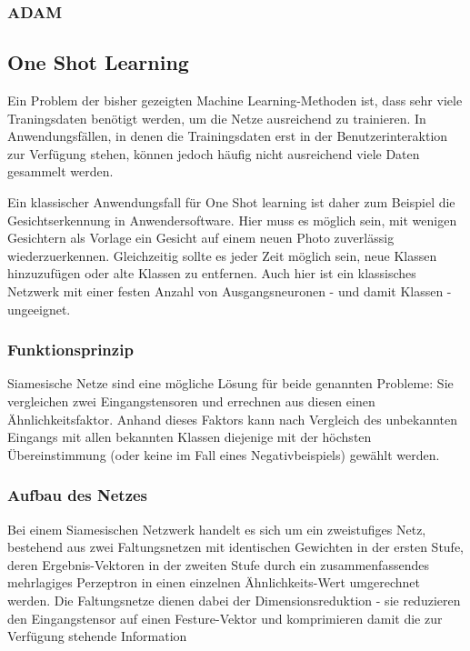 		\subsubsection{ADAM}
		
	\subsection{ One Shot Learning }
	Ein Problem der bisher gezeigten Machine Learning-Methoden ist, dass sehr viele Traningsdaten benötigt werden, um die Netze ausreichend zu trainieren. In Anwendungsfällen, in denen die Trainingsdaten erst in der Benutzerinteraktion zur Verfügung stehen, können jedoch häufig nicht ausreichend viele Daten gesammelt werden. 
	
	Ein klassischer Anwendungsfall für One Shot learning ist daher zum Beispiel die Gesichtserkennung in Anwendersoftware. Hier muss es möglich sein, mit wenigen Gesichtern als Vorlage ein Gesicht auf einem neuen Photo zuverlässig wiederzuerkennen. Gleichzeitig sollte es jeder Zeit möglich sein, neue Klassen hinzuzufügen oder alte Klassen zu entfernen. Auch hier ist ein klassisches Netzwerk mit einer festen Anzahl von Ausgangsneuronen - und damit Klassen - ungeeignet.

	\subsubsection{Funktionsprinzip}
		Siamesische Netze sind eine mögliche Lösung für beide genannten Probleme: Sie vergleichen zwei Eingangstensoren und errechnen aus diesen einen Ähnlichkeitsfaktor. Anhand dieses Faktors kann nach Vergleich des unbekannten Eingangs mit allen bekannten Klassen diejenige mit der höchsten Übereinstimmung (oder keine im Fall eines Negativbeispiels) gewählt werden.
		
	\subsubsection{Aufbau des Netzes}
	 Bei einem Siamesischen Netzwerk handelt es sich um ein zweistufiges Netz, bestehend aus zwei Faltungsnetzen mit identischen Gewichten in der ersten Stufe, deren Ergebnis-Vektoren in der zweiten Stufe durch ein zusammenfassendes mehrlagiges Perzeptron in einen einzelnen Ähnlichkeits-Wert umgerechnet werden.
	 Die Faltungsnetze dienen dabei der Dimensionsreduktion - sie reduzieren den Eingangstensor auf einen Festure-Vektor und komprimieren damit die zur Verfügung stehende Information 
	 
